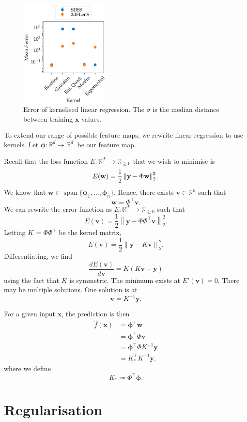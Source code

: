 \documentclass[11pt,twoside,openright]{report}
\newcommand\bphi{\bm{\phi}}
\newcommand\bbR{\mathbb{R}}
\newcommand\bv{\mathbf{v}}
\newcommand\bw{\mathbf{w}}
\newcommand\bx{\mathbf{x}}
\newcommand\by{\mathbf{y}}
\newcommand\norm[1]{\left\|#1\right\|}
\DeclareMathOperator{\spn}{span}
\begin{document}
  \begin{figure}
    \centering
    \includegraphics[width=0.4\textwidth]{linreg_kernelised.pdf}
    \caption{Error of kernelised linear regression. The $\sigma$ is the median distance between training $\bx$ values.}
    \label{fig:linreg_kernelised}
  \end{figure}

To extend our range of possible feature maps, we rewrite linear regression to use kernels. Let $\bphi : \bbR^{d} \to \bbR^{d'}$ be our feature map.

Recall that the loss function $E : \bbR^{d'} \to \bbR_{\geq0}$ that we wish to minimise is \[
    E(\bw) = \frac{1}{2}\norm{\by - \Phi\bw}_2^2 \text.
\] We know that $\bw \in \spn\{\bphi_1, \dots, \bphi_n\}$. Hence, there exists $\bv \in \bbR^n$ such that \[
    \bw = \Phi^\top\bv \text{.}
\] We can rewrite the error function as $E : \bbR^{d'} \to \bbR_{\geq0}$ such that \[
    E(\bv) = \frac{1}{2}\norm{\by - \Phi\Phi^\top\bv}_2^2 \text{.}
\] Letting $K \coloneqq \Phi\Phi^\top$ be the kernel matrix,\[
    E(\bv) = \frac{1}{2}\norm{\by - K\bv}_2^2\text{.}
\] Differentiating, we find \[
    \frac{dE(\bv)}{d\bv} = K(K\bv - \by)
\] using the fact that $K$ is symmetric. The minimum exists at $E'(\bv) = 0$. There may be multiple solutions. One solution is at \[
    \bv = K^{-1}\by \text{.}
\]

For a given input $\bx$, the prediction is then \begin{align*}
    \hat f(\bx) &= \bphi^\top \bw \\
    &= \bphi^\top \Phi \bv \\
    &= \bphi^\top \Phi K^{-1}\by \\
    &= K_*^\top K^{-1}\by \text{,}
\end{align*} where we define \[
    K_* \coloneqq \Phi^\top\bphi \text{.}
\]

\section{Regularisation}
\end{document}
